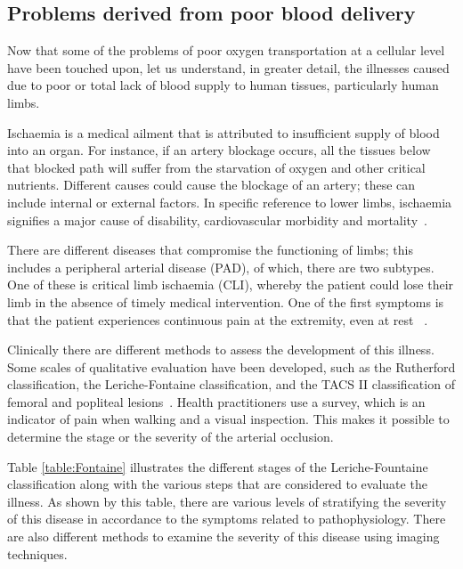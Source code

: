 \subsection{Problems derived from poor blood delivery} %
\label{section literature 4,1}
Now that some of the problems of poor oxygen transportation at a cellular level have been touched upon, let us understand, in greater detail, the illnesses caused due to poor or total lack of blood supply to human tissues, particularly human limbs. 

Ischaemia is a medical ailment that is attributed to insufficient supply of blood into an organ. For instance, if an artery blockage occurs, all the tissues below that blocked path will suffer from the starvation of oxygen and other critical nutrients. Different causes could cause the blockage of an artery; these can include internal or external factors. In specific reference to lower limbs, ischaemia signifies a major cause of disability, cardiovascular morbidity and mortality~\cite{novo1995patients}.

There are different diseases that compromise the functioning of limbs; this includes a peripheral arterial disease (PAD), of which, there are two subtypes. One of these is critical limb ischaemia (CLI), whereby the patient could lose their limb in the absence of timely medical intervention. One of the first symptoms is that the patient experiences continuous pain at the extremity, even at rest ~\cite{novo2004critical}. 

Clinically there are different methods to assess the development of this illness. Some scales of qualitative evaluation have been developed, such as the Rutherford classification, the Leriche-Fontaine classification, and the TACS II classification of femoral and popliteal lesions~\cite{norgren2007inter}. Health practitioners use a survey, which is an indicator of pain when walking and a visual inspection. This makes it possible to determine the stage or the severity of the arterial occlusion. 

Table \ref{table:Fontaine} illustrates the different stages of the Leriche-Fountaine classification along with the various steps that are considered to evaluate the illness.
As shown by this table, there are various levels of stratifying the severity of this disease in accordance to the symptoms related to pathophysiology. There are also different methods to examine the severity of this disease using imaging techniques.

